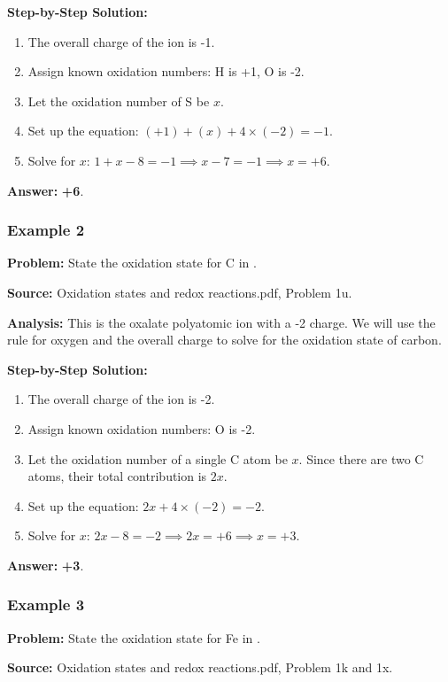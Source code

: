 \documentclass{article}
\begin{document}
\textbf{Step-by-Step Solution:}
\begin{enumerate}
    \item The overall charge of the ion is -1.
    \item Assign known oxidation numbers: H is +1, O is -2.
    \item Let the oxidation number of S be $x$.
    \item Set up the equation: $(+1) + (x) + 4 \times (-2) = -1$.
    \item Solve for $x$: $1 + x - 8 = -1 \implies x - 7 = -1 \implies x = +6$.
\end{enumerate}

\textbf{Answer:} \textbf{+6}.

\subsubsection{Example 2}
\textbf{Problem:} State the oxidation state for C in .

\textbf{Source:} Oxidation states and redox reactions.pdf, Problem 1u.

\textbf{Analysis:} This is the oxalate polyatomic ion with a -2 charge. We will use the rule for oxygen and the overall charge to solve for the oxidation state of carbon.

\textbf{Step-by-Step Solution:}
\begin{enumerate}
    \item The overall charge of the ion is -2.
    \item Assign known oxidation numbers: O is -2.
    \item Let the oxidation number of a single C atom be $x$. Since there are two C atoms, their total contribution is $2x$.
    \item Set up the equation: $2x + 4 \times (-2) = -2$.
    \item Solve for $x$: $2x - 8 = -2 \implies 2x = +6 \implies x = +3$.
\end{enumerate}

\textbf{Answer:} \textbf{+3}.

\subsubsection{Example 3}
\textbf{Problem:} State the oxidation state for Fe in .

\textbf{Source:} Oxidation states and redox reactions.pdf, Problem 1k and 1x.
\end{document}
